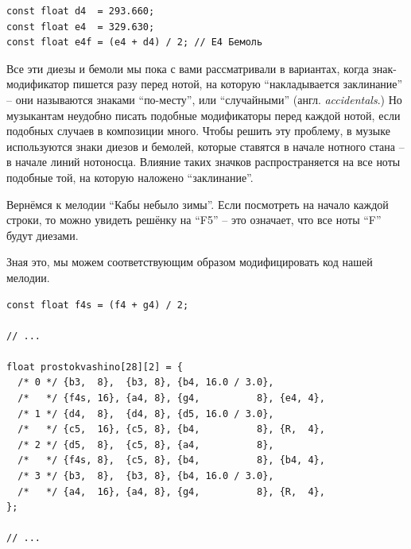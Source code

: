 \documentclass[a4paper,twoside]{book}
\begin{document}
\begin{verbatim}
const float d4  = 293.660;
const float e4  = 329.630;
const float e4f = (e4 + d4) / 2; // E4 Бемоль
\end{verbatim}

Все эти диезы и бемоли мы пока с вами рассматривали в вариантах, когда
знак-модификатор пишется разу перед нотой, на которую ``накладывается
заклинание'' -- они называются знаками ``по-месту'', или ``случайными'' (англ.
\emph{accidentals}.) Но музыкантам неудобно писать подобные модификаторы перед
каждой нотой, если подобных случаев в композиции много. Чтобы решить эту
проблему, в музыке используются знаки диезов и бемолей, которые ставятся в
начале нотного стана -- в начале линий нотоносца. Влияние таких значков
распространяется на все ноты подобные той, на которую наложено ``заклинание''.

Вернёмся к мелодии ``Кабы небыло зимы''.  Если посмотреть на начало каждой
строки, то можно увидеть решёнку на ``F5'' -- это означает, что все ноты ``F''
будут диезами.


Зная это, мы можем соответствующим образом модифицировать код нашей мелодии.

\begin{verbatim}
const float f4s = (f4 + g4) / 2;

// ...

float prostokvashino[28][2] = {
  /* 0 */ {b3,  8},  {b3, 8}, {b4, 16.0 / 3.0},
  /*   */ {f4s, 16}, {a4, 8}, {g4,          8}, {e4, 4},
  /* 1 */ {d4,  8},  {d4, 8}, {d5, 16.0 / 3.0},
  /*   */ {c5,  16}, {c5, 8}, {b4,          8}, {R,  4},
  /* 2 */ {d5,  8},  {c5, 8}, {a4,          8},
  /*   */ {f4s, 8},  {c5, 8}, {b4,          8}, {b4, 4},
  /* 3 */ {b3,  8},  {b3, 8}, {b4, 16.0 / 3.0},
  /*   */ {a4,  16}, {a4, 8}, {g4,          8}, {R,  4},
};

// ...
\end{verbatim}
\end{document}
